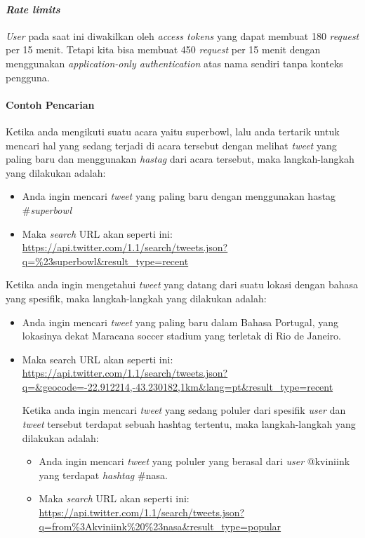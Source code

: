 \paragraph{\textit{Rate limits}}
\textit{User} pada saat ini diwakilkan oleh \textit{access tokens} yang dapat membuat 180 \textit{request} per 15 menit. Tetapi kita bisa membuat 450 \textit{request} per 15 menit dengan menggunakan \textit{application-only authentication} atas nama sendiri tanpa konteks pengguna.

\paragraph{Contoh Pencarian}
Ketika anda mengikuti suatu acara yaitu superbowl, lalu anda tertarik untuk mencari hal yang sedang terjadi di acara tersebut dengan melihat \textit{tweet} yang paling baru dan menggunakan \textit{hastag} dari acara tersebut, maka langkah-langkah yang dilakukan adalah:
\begin{itemize}
	\item Anda ingin mencari \textit{tweet} yang paling baru dengan menggunakan hastag \#\textit{superbowl}
	\item Maka \textit{search} URL akan seperti ini:
	\url{https://api.twitter.com/1.1/search/tweets.json?q=\%23superbowl\&result\_type=recent}
\end{itemize}

Ketika anda ingin mengetahui \textit{tweet} yang datang dari suatu lokasi dengan bahasa yang spesifik, maka langkah-langkah yang dilakukan adalah:
\begin{itemize}
	\item Anda ingin mencari \textit{tweet} yang paling baru dalam Bahasa Portugal, yang lokasinya dekat Maracana soccer stadium yang terletak di Rio de Janeiro.
	\item Maka search URL akan seperti ini:
	\url{https://api.twitter.com/1.1/search/tweets.json?q=\&geocode=-22.912214,-43.230182,1km\&lang=pt\&result\_type=recent}
	
Ketika anda ingin mencari \textit{tweet} yang sedang poluler dari spesifik \textit{user} dan \textit{tweet} tersebut terdapat sebuah hashtag tertentu, maka langkah-langkah yang dilakukan adalah:
\begin{itemize}
	\item Anda ingin mencari \textit{tweet} yang poluler yang berasal dari \textit{user} @kviniink yang terdapat \textit{hashtag} \#nasa.
	\item Maka \textit{search} URL akan seperti ini:
	\url{https://api.twitter.com/1.1/search/tweets.json?q=from\%3Akviniink\%20\%23nasa\&result\_type=popular}
\end{itemize}
\end{itemize}

